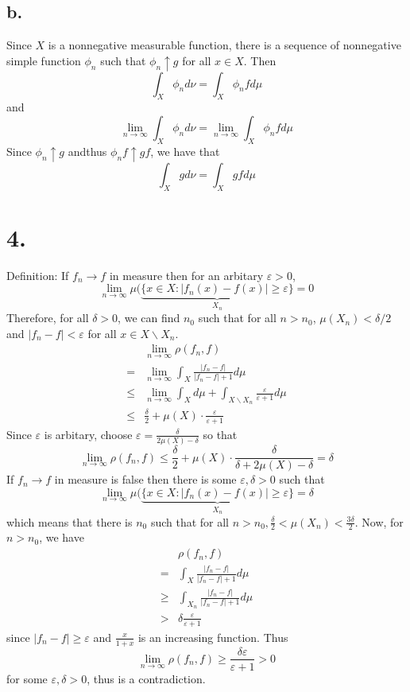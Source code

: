 \documentclass[11pt]{article}
\theoremstyle{mystyle}
\theoremstyle{definition}
\begin{document}
\subsection*{b.}
Since $X$ is a nonnegative measurable function, there is a sequence of nonnegative simple function $\phi_n$ such that $\phi_n \uparrow g$ for all $x \in X$. Then 
\[
  \int_X \phi_n d\nu = \int_X \phi_n f d\mu
\]
and 
\[
  \lim_{n \to \infty} \int_X \phi_n d\nu = \lim_{n \to \infty} \int_X \phi_n f d\mu
\]
Since $\phi_n \uparrow g$ andthus $\phi_n f \uparrow gf$, we have that 
\[
  \int_X g d\nu = \int_X gf d\mu
\]
\newpage
\section*{4.}
Definition: If $f_n \to f$ in measure then for an arbitary $\varepsilon > 0$,  
\[
  \lim_{n \to \infty} \mu(\underbrace{\{x \in X: |f_n(x) - f(x)| \ge \varepsilon\}}_{X_n} = 0
\]
Therefore, for all $\delta > 0$, we can find $n_0$ such that for all $n>n_0$, $\mu(X_n) < \delta/2$ and $|f_n-f| < \varepsilon$ for all $x \in X \backslash X_n$.  
\begin{align*} 
  &\lim_{n \to \infty} \rho(f_n, f) \\ 
  =& \lim_{n \to \infty} \int_X \displaystyle\frac{|f_n-f|}{|f_n - f| + 1} d\mu \\
  \le& \lim_{n \to \infty} \int_X d\mu + \int_{X\backslash X_n} \displaystyle\frac{\varepsilon}{\varepsilon + 1} d\mu \\
  \le& \displaystyle\frac{\delta}{2} + \mu(X) \cdot \displaystyle\frac{\varepsilon}{\varepsilon + 1}  
\end{align*}
Since $\varepsilon$ is arbitary, choose $\varepsilon = \displaystyle\frac{\delta}{2\mu(X)-\delta}$ so that 
\[
  \lim_{n \to \infty} \rho(f_n, f) \le \displaystyle\frac{\delta}{2} + \mu(X) \cdot \displaystyle\frac{\delta}{\delta + 2\mu(X) - \delta} = \delta
\]
If $f_n \to f$ in measure is false then there is some $\varepsilon, \delta > 0$ such that 
\[ 
  \lim_{n \to \infty} \mu(\underbrace{\{x \in X: |f_n(x) - f(x)| \ge \varepsilon\}}_{X_n} = \delta
\]
which means that there is $n_0$ such that for all $n>n_0, \displaystyle\frac{\delta}{2} < \mu(X_n) < \displaystyle\frac{3\delta}{2}$. Now, for $n>n_0$, we have 
\begin{align*}
  &\rho(f_n, f) \\
  =& \int_X \displaystyle\frac{|f_n-f|}{|f_n - f| + 1} d\mu \\
  \ge& \int_{X_n} \displaystyle\frac{|f_n-f|}{|f_n-f|+ 1} d\mu \\
  >& \delta \displaystyle\frac{\varepsilon}{\varepsilon + 1} 
\end{align*} 
since $|f_n - f| \ge \varepsilon$ and $\displaystyle\frac{x}{1+x}$ is an increasing function. Thus 
\[
  \lim_{n \to \infty} \rho(f_n, f) \ge \displaystyle\frac{\delta \varepsilon}{\varepsilon+1} > 0
\]
for some $\varepsilon, \delta > 0$, thus is a contradiction. 
\newpage
\end{document}
